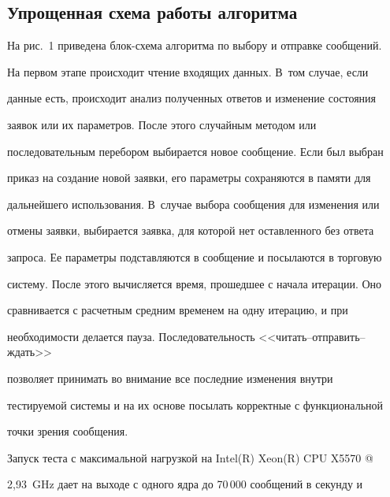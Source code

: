 \vspace*{-6pt}





  \subsection{Упрощенная схема работы алгоритма}





  На рис.~1 приведена блок-схема алгоритма по выбору и отправке сообщений.


На первом этапе происходит чтение входящих данных. В~том случае, если


данные есть, происходит анализ полученных ответов и изменение состояния


заявок или их параметров. После этого случайным методом или


последовательным перебором выбирается новое сообщение. Если был выбран


приказ на создание новой заявки, его параметры сохраняются в памяти для


дальнейшего использования. В~случае выбора сообщения для изменения или


отмены заявки, выбирается заявка, для которой нет оставленного без ответа


запроса. Ее параметры подставляются в сообщение и посылаются в торговую


систему. После этого вычисляется время, прошедшее с начала итерации. Оно


сравнивается с расчетным средним временем на одну итерацию, и при


необходимости делается пауза. Последовательность <<чи\-тать--от\-пра\-вить--ждать>>


позволяет принимать во внимание все последние изменения внутри


тестируемой системы и на их основе посылать корректные с функциональной


точки зрения сообщения.














  Запуск теста с максимальной нагрузкой на Intel(R) Xeon(R) CPU X5570 @


2,93~GHz дает на выходе с одного ядра до 70\,000 сообщений в секунду и


